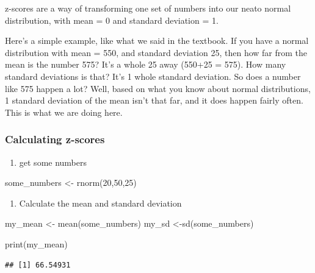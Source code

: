 \documentclass[
]{book}
\newenvironment{Shaded}{\begin{snugshade}}{\end{snugshade}}
\newcommand{\DecValTok}[1]{\textcolor[rgb]{0.00,0.00,0.81}{#1}}
\newcommand{\FunctionTok}[1]{\textcolor[rgb]{0.00,0.00,0.00}{#1}}
\newcommand{\NormalTok}[1]{#1}
\newcommand{\OtherTok}[1]{\textcolor[rgb]{0.56,0.35,0.01}{#1}}
\providecommand{\tightlist}{%
  \setlength{\itemsep}{0pt}\setlength{\parskip}{0pt}}
\begin{document}
z-scores are a way of transforming one set of numbers into our neato normal distribution, with mean = 0 and standard deviation = 1.

Here's a simple example, like what we said in the textbook. If you have a normal distribution with mean = 550, and standard deviation 25, then how far from the mean is the number 575? It's a whole 25 away (550+25 = 575). How many standard deviations is that? It's 1 whole standard deviation. So does a number like 575 happen a lot? Well, based on what you know about normal distributions, 1 standard deviation of the mean isn't that far, and it does happen fairly often. This is what we are doing here.

\hypertarget{calculating-z-scores}{%
\subsubsection{Calculating z-scores}\label{calculating-z-scores}}

\begin{enumerate}
\def\labelenumi{\arabic{enumi}.}
\tightlist
\item
  get some numbers
\end{enumerate}

\begin{Shaded}
\begin{Highlighting}[]
\NormalTok{some\_numbers }\OtherTok{\textless{}{-}} \FunctionTok{rnorm}\NormalTok{(}\DecValTok{20}\NormalTok{,}\DecValTok{50}\NormalTok{,}\DecValTok{25}\NormalTok{)}
\end{Highlighting}
\end{Shaded}

\begin{enumerate}
\def\labelenumi{\arabic{enumi}.}
\setcounter{enumi}{1}
\tightlist
\item
  Calculate the mean and standard deviation
\end{enumerate}

\begin{Shaded}
\begin{Highlighting}[]
\NormalTok{my\_mean }\OtherTok{\textless{}{-}} \FunctionTok{mean}\NormalTok{(some\_numbers)}
\NormalTok{my\_sd }\OtherTok{\textless{}{-}}\FunctionTok{sd}\NormalTok{(some\_numbers)}

\FunctionTok{print}\NormalTok{(my\_mean)}
\end{Highlighting}
\end{Shaded}

\begin{verbatim}
## [1] 66.54931
\end{verbatim}
\end{document}
